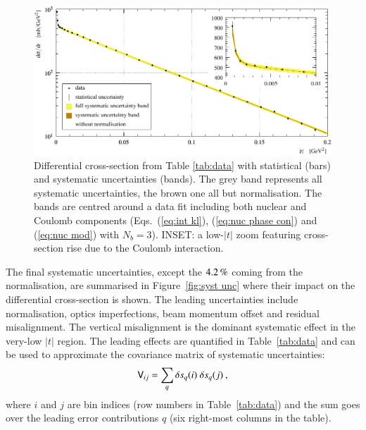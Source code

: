 \begin{figure}
\vskip-5mm
\begin{center}
\includegraphics{fig/t_dist_tabulation.pdf}
\vskip-3mm
\caption{%
Differential cross-section from Table \ref{tab:data} with statistical (bars) and systematic uncertainties (bands). The grey band represents all systematic uncertainties, the brown one all but normalisation. The bands are centred around a data fit including both nuclear and Coulomb components (Eqs.~(\ref{eq:int kl}), (\ref{eq:nuc phase con}) and (\ref{eq:nuc mod}) with $N_b=3$). INSET: a low-$|t|$ zoom featuring cross-section rise due to the Coulomb interaction.
}
\label{fig:dsdt}
\end{center}
\end{figure}

The final systematic uncertainties, except the $4.2\,{\rm \%}$ coming from the normalisation, are summarised in Figure~\ref{fig:syst unc} where their impact on the differential cross-section is shown. The leading uncertainties include normalisation, optics imperfections, beam momentum offset and residual misalignment. The vertical misalignment is the dominant systematic effect in the very-low $|t|$ region. The leading effects are quantified in Table~\ref{tab:data} and can be used to approximate the covariance matrix of systematic uncertainties:
\begin{equation}
\label{eq:covar mat}
\mathsf{V}_{ij} = \sum_{q} \delta s_{q}(i)\ \delta s_{q}(j)\: ,
\end{equation}
where $i$ and $j$ are bin indices (row numbers in Table~\ref{tab:data}) and the sum goes over the leading error contributions $q$ (six right-most columns in the table).

